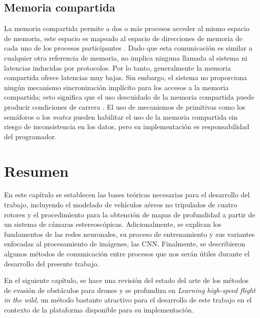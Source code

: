 \subsection{Memoria compartida}

La memoria compartida permite a dos o más procesos acceder al mismo espacio de memoria, este espacio es mapeado al espacio de direcciones de memoria de cada uno de los procesos participantes \cite{IPCEval2015}. Dado que esta comunicación es similar a cualquier otra referencia de memoria, no implica ninguna llamada al sistema ni latencias inducidas por protocolos. Por lo tanto, generalmente la memoria compartida ofrece latencias muy bajas. Sin embargo, el sistema no proporciona ningún mecanismo sincronización implícito para los accesos a la memoria compartida; esto significa que el uso descuidado de la memoria compartida puede producir condiciones de carrera \cite{IPCEval2015}. El uso de mecanismos de primitivas como los semáforos o los \textit{mutex} pueden habilitar el uso de la memoria compartida sin riesgo de inconsistencia en los datos, pero su implementación es responsabilidad del programador.

\section{Resumen}

En este capítulo se establecen las bases teóricas necesarias para el desarrollo del trabajo, incluyendo el modelado de vehículos aéreos no tripulados de cuatro rotores y el procedimiento para la obtención de mapas de profundidad a partir de un sistema de cámaras estereoscópicas. Adicionalmente, se explican los fundamentos de las redes neuronales, su proceso de entrenamiento y sus variantes enfocadas al procesamiento de imágenes, las CNN. Finalmente, se describieron algunos métodos de comunicación entre procesos que nos serán útiles durante el desarrollo del presente trabajo.

En el siguiente capítulo, se hace una revisión del estado del arte de los métodos de evasión de obstáculos para drones y se profundiza en \textit{Learning high-speed flight in the wild}, un método bastante atractivo para el desarrollo de este trabajo en el contexto de la plataforma disponible para su implementación.